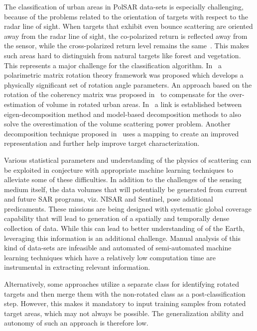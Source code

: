 The classification of urban areas in PolSAR data-sets is especially challenging, because of the problems related to the orientation of targets with respect to the radar line of sight.
When targets that exhibit even bounce scattering are oriented away from the radar line of sight, the co-polarized return is reflected away from the sensor, while the cross-polarized return level remains the same~\cite{yamaguchi2011_y4r,7862796}. This makes such areas hard to distinguish from natural targets like forest and vegetation. This represents a major challenge for the classification algorithm. In~\cite{chen2014uniform} a polarimetric matrix rotation theory framework was proposed which develops a physically significant set of rotation angle parameters.  An approach based on the rotation of the coherency matrix was proposed in~\cite{yamaguchi2011four} to compensate for the over-estimation of volume in rotated urban areas. In~\cite{zou2016eigen}   a link is established between eigen-decomposition method and model-based decomposition methods to also solve the overestimation of the volume scattering power problem. Another decomposition technique proposed in~\cite{7872383} uses a mapping to create an improved representation and further help improve target characterization. 

Various statistical parameters and understanding of the physics of scattering can be exploited in conjecture with appropriate machine learning techniques to alleviate some of these difficulties. In addition to the challenges of the sensing medium itself, the data volumes that will potentially be generated from current and future SAR programs, viz. NISAR and Sentinel, pose  additional predicaments. These missions are being designed with systematic global coverage capability that will lead to generation of a spatially and temporally dense collection of data. While this can lead to better understanding of of the Earth, leveraging this information is an additional challenge. Manual analysis of this kind of data-sets are infeasible and automated of semi-automated machine learning techniques which have a relatively low computation time are instrumental in extracting relevant information. 

Alternatively, some approaches utilize a separate class for identifying rotated targets and then merge them with the non-rotated class as a post-classification step.  However, this makes it mandatory to input training samples from rotated target areas, which may not always be possible. The generalization ability and autonomy of such an approach is therefore low.

